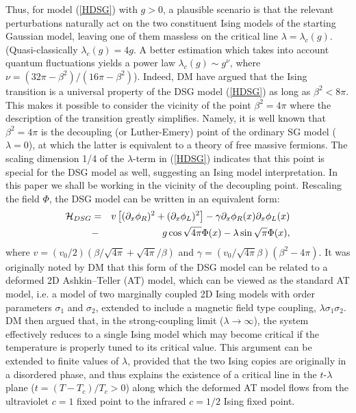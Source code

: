 Thus, for model (\ref{HDSG}) with $g > 0$,
a plausible scenario is that
the relevant perturbations
naturally act on the two constituent
Ising models of the starting Gaussian model,
leaving one of them massless on the
critical line $\lambda=\lambda_c(g)$.
(Quasi-classically $\lambda_c(g)=4g$. A better estimation which takes into
account quantum fluctuations yields a power law $\lambda_c(g) \sim g^{\nu}$,
where $\nu = \left(32\pi - \beta^2 \right)/\left(16\pi - \beta^2 \right)$).
Indeed,
DM have argued that the Ising transition is a
universal property of the DSG model (\ref{HDSG}) as long as $\beta^2 < 8\pi$.
This makes it possible to consider the vicinity of the point
$\beta^2 = 4\pi$ where the description of the transition greatly simplifies.
Namely,
it is well known\cite{Coleman,LE} that $\beta^2 = 4\pi$ is the decoupling
(or Luther-Emery) point of the ordinary SG model ($\lambda = 0$),
at which the latter is equivalent to a theory of free massive fermions.
The scaling dimension 1/4 of the $\lambda$-term in (\ref{HDSG}) indicates
that this point is special for the DSG model as well, suggesting
an Ising model interpretation. In this paper we shall be working in
the vicinity of the decoupling point. Rescaling the field $\Phi$,
the DSG model can be written in an equivalent form:
\begin{eqnarray}
{\cal{H}}_{DSG}&=&v\left[ (\partial_x\phi_R)^2+(\partial_x\phi_L)^2\right]
-\gamma\partial_x\phi_R(x)\partial_x\phi_L(x)\nonumber\\&-&
g\cos\sqrt{4\pi}\Phi(x)-\lambda\sin\sqrt{\pi}\Phi(x),
\label{HDSGbis}
\end{eqnarray}
where $v=(v_0/2)(\beta/\sqrt{4\pi}+\sqrt{4\pi}/\beta)$
and $\gamma=(v_0/\sqrt{4\pi}\beta)(\beta^2-4\pi)$.
It was originally noted by DM that this form of
the DSG model can be related to a deformed 2D Ashkin--Teller (AT)
model, which can be viewed as the standard AT model, i.e.
a model of two marginally coupled 2D Ising models
with order parameters $\sigma_1$ and $\sigma_2$, extended to
include a magnetic field type coupling, $\lambda \sigma_1 \sigma_2$.
DM then argued that, in the strong-coupling limit
($\lambda \rightarrow \infty$), the system effectively reduces
to a single Ising model which may become critical if the
temperature is properly tuned to its critical value.
This argument can be extended to finite values of $\lambda$,
provided that the two Ising copies are originally
in a disordered phase, and thus explains the existence of a critical line
in the $t$-$\lambda$ plane ($t = (T - T_c)/T_c > 0$)
along which the deformed AT model flows from the ultraviolet
$c = 1$ fixed point to the infrared $c = 1/2$ Ising fixed point.

